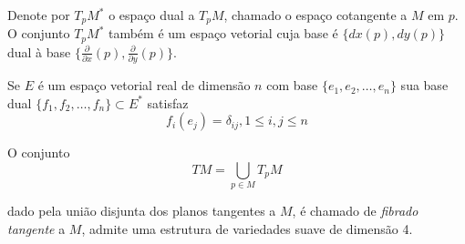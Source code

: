 \begin{obse}
	Denote por $T_p M^*$ o espaço dual a $T_p M$, chamado o espaço cotangente a $M$ em $p$. O conjunto $T_p M^*$ também é um espaço vetorial cuja base é $\{ dx(p), dy(p)  \}$ dual à base $\{ \frac{\partial}{\partial x}(p), \frac{\partial}{\partial y}(p) \}$.
\end{obse}

\begin{lembrete}
	Se $E$ é um espaço vetorial real de dimensão $n$ com base $\{ e_1, e_2, \ldots, e_n \}$ sua base dual $\{ f_1, f_2, \ldots, f_n \} \subset E^*$ satisfaz
	\begin{equation*}
		f_i (e_j) = \delta_{ij}, 1 \leq i,j \leq n
	\end{equation*}
\end{lembrete}

	O conjunto
	\begin{equation*}
		TM = \bigcup_{p \in M} T_p M
	\end{equation*}
	
	dado pela união disjunta dos planos tangentes a $M$, é chamado de \emph{fibrado tangente} a $M$, admite uma estrutura de variedades suave de dimensão 4.